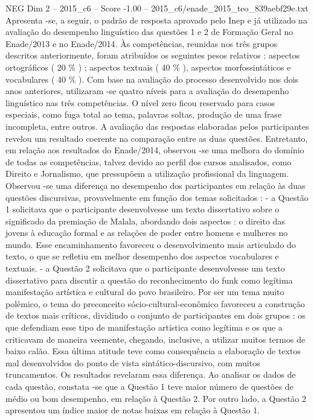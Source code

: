 \begin{textsample}{NEG Dim 2 – 2015\_c6 – Score -1.00 – 2015\_c6/enade\_2015\_teo\_839aebf29e.txt}
Apresenta -se, a seguir, o padrão de resposta aprovado pelo Inep e já utilizado na avaliação do desempenho linguístico das questões 1 e 2 de Formação Geral no Enade/2013 e no Enade/2014.
Às competências, reunidas nos três grupos descritos anteriormente, foram atribuídos os seguintes pesos relativos : aspectos ortográficos ( 20 \% ) ; aspectos textuais ( 40 \% ), aspectos morfossintáticos e vocabulares ( 40 \% ).
Com base na avaliação do processo desenvolvido nos dois anos anteriores, utilizaram -se quatro níveis para a avaliação do desempenho linguístico nas três competências.
O nível zero ficou reservado para casos especiais, como fuga total ao tema, palavras soltas, produção de uma frase incompleta, entre outros.
A avaliação das respostas elaboradas pelos participantes revelou um resultado coerente na comparação entre as duas questões.
Entretanto, em relação aos resultados do Enade/2014, observou -se uma melhora do domínio de todas as competências, talvez devido ao perfil dos cursos analisados, como Direito e Jornalismo, que pressupõem a utilização profissional da linguagem.
Observou -se uma diferença no desempenho dos participantes em relação às duas questões discursivas, provavelmente em função dos temas solicitados : - a Questão 1 solicitava que o participante desenvolvesse um texto dissertativo sobre o significado da premiação de Malala, abordando dois aspectos : o direito das jovens à educação formal e as relações de poder entre homens e mulheres no mundo.
Esse encaminhamento favoreceu o desenvolvimento mais articulado do texto, o que se refletiu em melhor desempenho dos aspectos vocabulares e textuais. - a Questão 2 solicitava que o participante desenvolvesse um texto dissertativo para discutir a questão do reconhecimento do funk como legítima manifestação artística e cultural do povo brasileiro.
Por ser um tema muito polêmico, o tema do preconceito sócio-cultural-econômico favoreceu a construção de textos mais críticos, dividindo o conjunto de participantes em dois grupos : os que defendiam esse tipo de manifestação artística como legítima e os que a criticavam de maneira veemente, chegando, inclusive, a utilizar muitos termos de baixo calão.
Essa última atitude teve como consequência a elaboração de textos mal desenvolvidos do ponto de vista sintático-discursivo, com muitos truncamentos.
Os resultados revelaram essa diferença.
Ao analisar os dados de cada questão, constata -se que a Questão 1 teve maior número de questões de médio ou bom desempenho, em relação à Questão 2.
Por outro lado, a Questão 2 apresentou um índice maior de notas baixas em relação à Questão 1.

\end{textsample}
